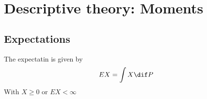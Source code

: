\section[Lecture 7]{Descriptive theory: Moments} %
\label{sec:descriptive_theory_moments}
\subsection{Expectations} %
\label{sub:expectations}
\begin{defn}
The expectatin is given by
\[
	EX=\int X\dif P
\]
With \(X\geq 0\) or \(EX<\infty\)
\end{defn}
